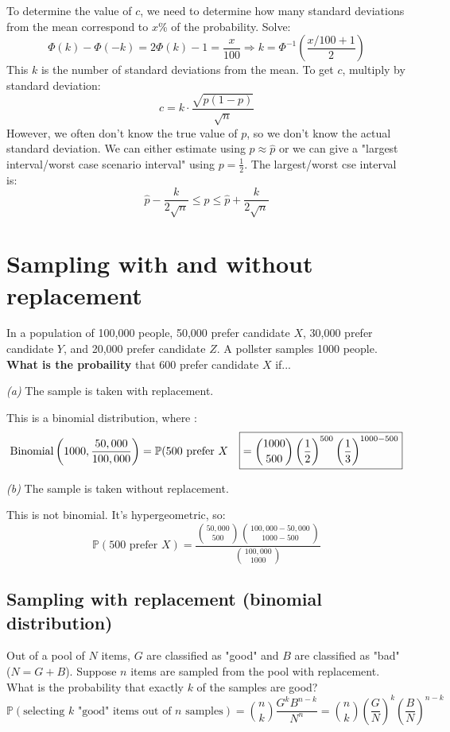 \documentclass[titlepage, 12pt, leqno]{article}
\begin{document}
To determine the value of $c$, we need to determine how many standard deviations from the mean correspond to $x$\% of the probability. Solve:
\[
    \Phi(k) - \Phi(-k) = 2\Phi(k) - 1 = \frac{x}{100} \Longrightarrow k = \Phi^{-1} \left(\frac{x/100+1}{2} \right)
\]
This $k$ is the number of standard deviations from the mean. To get $c$, multiply by standard deviation:
\[
    c = k \cdot \frac{\sqrt{p(1-p)}}{\sqrt n} 
\]
However, we often don't know the true value of $p$, so we don't know the actual standard deviation. We can either estimate using $p \approx \hat p$ or we can give a "largest interval/worst case scenario interval" using $p = \frac{1}{2}$. The largest/worst cse interval is:
\[
\hat p - \frac{k}{2\sqrt n} \le p \le \hat p + \frac{k}{2\sqrt n} 
\]
\pagebreak
\section{Sampling with and without replacement}
\begin{ex}
    In a population of 100,000 people, 50,000 prefer candidate $X$, 30,000 prefer candidate $Y$, and 20,000 prefer candidate $Z$. A pollster samples 1000 people. \textbf{What is the probaility}  that 600 prefer candidate $X$ if...

    \textit{(a)} The sample is taken with replacement.
    
    This is a binomial distribution, where :
   \begin{align*}
       \text{Binomial}\left(1000, \frac{50,000}{100,000} \right) &= \mathbb{P}(500 \text{ prefer } X
       \Aboxed{&= \binom{1000}{500}\left(\frac{1}{2}\right)^{500}\left(\frac{1}{3} \right)^{1000-500}} 
   \end{align*}

    \textit{(b)} The sample is taken without replacement.

    This is not binomial. It's hypergeometric, so:
    \[
        \boxed{\mathbb{P}(500 \text{ prefer } X) = \frac{\binom{50,000}{500}\binom{100,000 - 50,000}{1000 - 500}}{\binom{100,000}{1000}} }
    \]
\end{ex}

\subsection{Sampling with replacement (binomial distribution)} Out of a pool of $N$ items, $G$ are classified as "good" and $B$ are classified as "bad" ($N = G + B$). Suppose $n$ items are sampled from the pool with replacement. What is the probability that exactly $k$ of the samples are good?
\[
    \mathbb{P}( \text{selecting }k \text{ "good" items out of } n \text{ samples}) = \binom{n}{k}\frac{G^kB^{n-k}}{N^n} = \binom{n}{k}\left(\frac{G}{N}\right)^k\left(\frac{B}{N}\right)^{n-k}
\]
\end{document}
